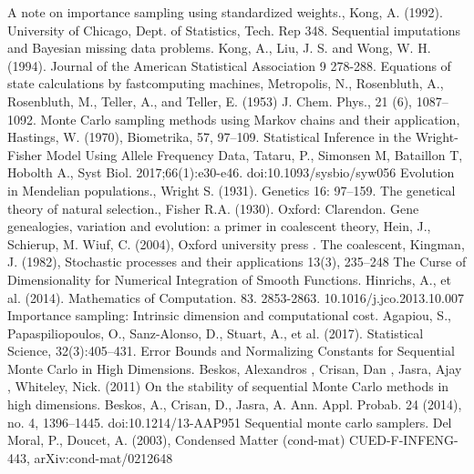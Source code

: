 \documentclass[12pt,mythesisstyle]{report}
\begin{document}
\begin{thebibliography}{99}
	 A note on importance sampling using standardized weights., Kong, A. (1992).  University of Chicago, Dept. of Statistics, Tech. Rep 348.
	 Sequential imputations and Bayesian missing data problems. Kong, A., Liu, J. S. and Wong, W. H. (1994). Journal of the American Statistical Association 9 278-288.
	Equations of state calculations by fastcomputing machines, Metropolis, N., Rosenbluth, A., Rosenbluth, M., Teller, A., and Teller, E. (1953) J. Chem. Phys., 21 (6), 1087–1092.
	 Monte Carlo sampling methods using Markov chains and their application, Hastings, W. (1970), Biometrika, 57, 97–109.
	 Statistical Inference in the Wright-Fisher Model Using Allele Frequency Data, Tataru, P., Simonsen M, Bataillon T, Hobolth A., Syst Biol. 2017;66(1):e30-e46. doi:10.1093/sysbio/syw056
	 Evolution in Mendelian populations., Wright S. (1931).  Genetics 16: 97–159.
	The genetical theory of natural selection., Fisher R.A. (1930). Oxford: Clarendon.
	 Gene genealogies, variation and evolution: a primer in coalescent theory, Hein, J., Schierup, M. Wiuf, C. (2004), Oxford university press .
	 The coalescent, Kingman, J. (1982), Stochastic processes and their applications
	13(3), 235–248
	 The Curse of Dimensionality for Numerical Integration of Smooth Functions. Hinrichs, A., et al. (2014).  Mathematics of Computation. 83. 2853-2863. 10.1016/j.jco.2013.10.007
	 Importance
	sampling: Intrinsic dimension and computational cost. Agapiou, S., Papaspiliopoulos, O., Sanz-Alonso, D., Stuart, A., et al. (2017).  Statistical Science, 32(3):405–431.
	 Error Bounds and Normalizing Constants for Sequential Monte Carlo in
	High Dimensions. Beskos, Alexandros , Crisan, Dan ,  Jasra, Ajay , Whiteley, Nick. (2011)
	 On the stability of sequential Monte Carlo methods in high dimensions. Beskos, A., Crisan, D., Jasra, A. Ann. Appl. Probab. 24 (2014), no. 4, 1396--1445. doi:10.1214/13-AAP951
	 Sequential monte carlo samplers. Del Moral, P., Doucet, A. (2003), Condensed Matter (cond-mat) CUED-F-INFENG-443,	arXiv:cond-mat/0212648

\end{thebibliography}
\end{document}
